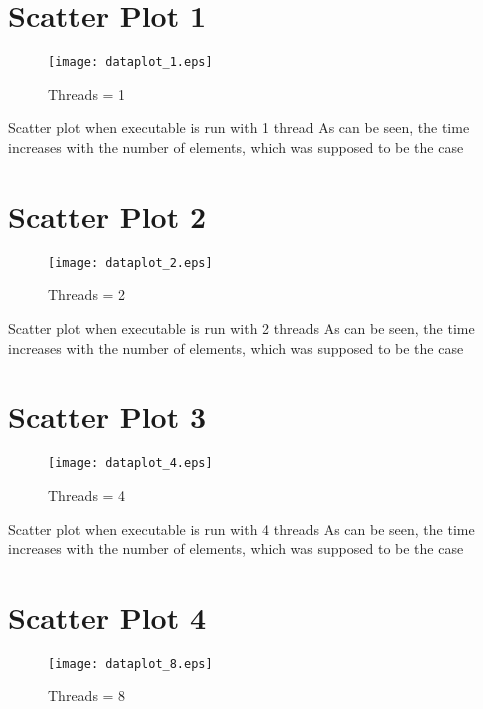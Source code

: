\documentclass{article}
\begin{document}
\section*{Scatter Plot 1}

\begin{figure}[H]
  \centering
  \texttt{[image: dataplot\_1.eps]}
  \caption{Threads = 1}
\end{figure}

Scatter plot when executable is run with 1 thread
\newline
As can be seen, the time increases with the number of elements, which was supposed to be the case
\newline

\section*{Scatter Plot 2}

\begin{figure}[H]
  \centering
  \texttt{[image: dataplot\_2.eps]}
  \caption{Threads = 2}
\end{figure}

Scatter plot when executable is run with 2 threads
\newline
As can be seen, the time increases with the number of elements, which was supposed to be the case
\newline
\section*{Scatter Plot 3}

\begin{figure}[H]
  \centering
  \texttt{[image: dataplot\_4.eps]}
  \caption{Threads = 4}
\end{figure}

Scatter plot when executable is run with 4 threads
\newline
As can be seen, the time increases with the number of elements, which was supposed to be the case
\newline
\section*{Scatter Plot 4}

\begin{figure}[H]
  \centering
  \texttt{[image: dataplot\_8.eps]}
  \caption{Threads = 8}
\end{figure}
\end{document}
